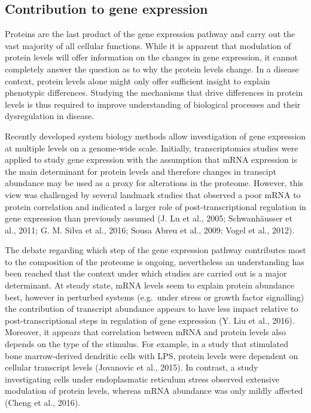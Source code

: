 \documentclass[12pt,openany]{book}
\begin{document}
\subsection{Contribution to gene expression} Proteins are the last
product of the gene expression pathway and carry out the vast majority
of all cellular functions. While it is apparent that modulation of
protein levels will offer information on the changes in gene expression,
it cannot completely answer the question as to why the protein levels
change. In a disease context, protein levels alone might only offer
sufficient insight to explain phenotypic differences. Studying the
mechanisms that drive differences in protein levels is thus required to
improve understanding of biological processes and their dysregulation in
disease.

Recently developed system biology methods allow investigation of gene
expression at multiple levels on a genome-wide scale. Initially,
transcriptomics studies were applied to study gene expression with the
assumption that mRNA expression is the main determinant for protein
levels and therefore changes in transcipt abundance may be used as a
proxy for alterations in the proteome. However, this view was challenged
by several landmark studies that observed a poor mRNA to protein
correlation and indicated a larger role of post-transcriptional
regulation in gene expression than previously assumed (J. Lu et al.,
2005; Schwanhäusser et al., 2011; G. M. Silva et al., 2016; Sousa Abreu
et al., 2009; Vogel et al., 2012).

The debate regarding which step of the gene expression pathway
contributes most to the composition of the proteome is ongoing,
nevertheless an understanding has been reached that the context under
which studies are carried out is a major determinant. At steady state,
mRNA levels seem to explain protein abundance best, however in perturbed
systems (e.g.~under stress or growth factor signalling) the contribution
of transcript abundance appears to have less impact relative to
post-transcriptional steps in regulation of gene expression (Y. Liu et
al., 2016). Moreover, it appears that correlation between mRNA and
protein levels also depends on the type of the stimulus. For example, in
a study that stimulated bone marrow-derived dendritic cells with LPS,
protein levels were dependent on cellular transcript levels (Jovanovic
et al., 2015). In contrast, a study investigating cells under
endoplasmatic reticulum stress observed extensive modulation of protein
levels, whereas mRNA abundance was only mildly affected (Cheng et al.,
2016).
\end{document}
